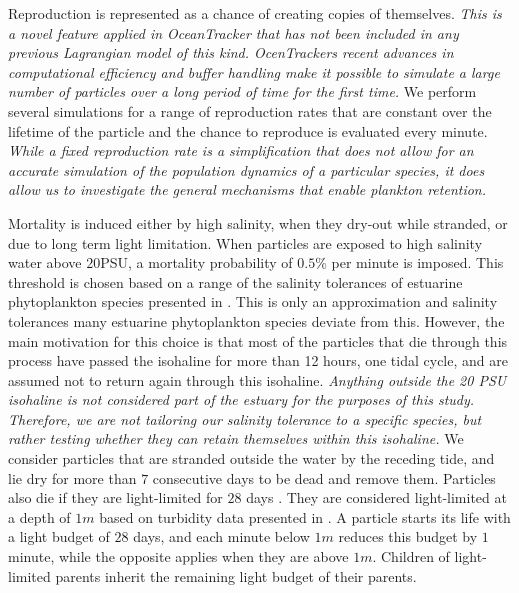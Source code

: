 \documentclass[npg, manuscript]{copernicus}
\begin{document}
Reproduction is represented as a chance of creating copies of themselves.
\textit{
    This is a novel feature applied in OceanTracker that has not been included in any previous Lagrangian model of this kind.
    OcenTrackers recent advances in computational efficiency and buffer handling \citep{Vennell2021} make it possible to simulate a large number of particles over a long period of time for the first time.
}
We perform several simulations for a range of reproduction rates that are constant over the lifetime of the particle and the chance to reproduce is evaluated every minute.
\textit{
    While a fixed reproduction rate is a simplification that does not allow for an accurate simulation of the population dynamics of a particular species, it does allow us to investigate the general mechanisms that enable plankton retention.
}

Mortality is induced either by high salinity, when they dry-out while stranded, or due to long term light limitation.
When particles are exposed to high salinity water above $20$PSU, a mortality probability of $0.5\%$ per minute is imposed.
This threshold is chosen based on a range of the salinity tolerances of estuarine phytoplankton species presented in \citep{vonAlvensleben2016}.
This is only an approximation and salinity tolerances many estuarine phytoplankton species deviate from this.
However, the main motivation for this choice is that most of the particles that die through this process have passed the isohaline for more than 12 hours, one tidal cycle, and are assumed not to return again through this isohaline.
\textit{
    Anything outside the 20 PSU isohaline is not considered part of the estuary for the purposes of this study.
    Therefore, we are not tailoring our salinity tolerance to a specific species, but rather testing whether they can retain themselves within this isohaline.
}
We consider particles that are stranded outside the water by the receding tide, and lie dry for more than $7$ consecutive days to be dead and remove them.
Particles also die if they are light-limited for $28$ days \citep{Walter2017}.
They are considered light-limited at a depth of $1 \unit{m}$ based on turbidity data presented in \citep{Pein2021}.
A particle starts its life with a light budget of $28$ days, and each minute below $1 \unit{m}$ reduces this budget by $1$ minute, while the opposite applies when they are above $1 \unit{m}$.
Children of light-limited parents inherit the remaining light budget of their parents.

\medskip
\end{document}
